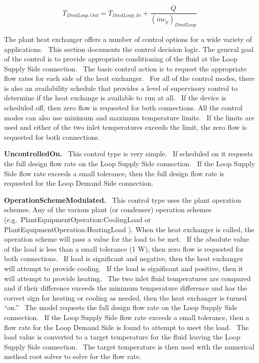 \begin{equation}
{T_{DmdLoop,Out}} = {T_{DmdLoop,In}} + \frac{{\dot Q}}{{{{\left( {\dot m{c_p}} \right)}_{DmdLoop}}}}
\end{equation}

The plant heat exchanger offers a number of control options for a wide variety of applications.~ This section documents the control decision logic. The general goal of the control is to provide appropriate conditioning of the fluid at the Loop Supply Side connection. ~The basic control action is to request the appropriate flow rates for each side of the heat exchanger.~ For all of the control modes, there is also an availability schedule that provides a level of supervisory control to determine if the heat exchange is available to run at all.~ If the device is scheduled off, then zero flow is requested for both connections. All the control modes can also use minimum and maximum temperature limits.~ If the limits are used and either of the two inlet temperatures exceeds the limit, the zero flow is requested for both connections.

\textbf{UncontrolledOn.}~ This control type is very simple.~ If scheduled on it requests the full design flow rate on the Loop Supply Side connection.~ If the Loop Supply Side flow rate exceeds a small tolerance, then the full design flow rate is requested for the Loop Demand Side connection.

\textbf{OperationSchemeModulated.}~ This control type uses the plant operation schemes. Any of the various plant (or condenser) operation schemes (e.g.~PlantEquipmentOperation:CoolingLoad or PlantEquipmentOperation:HeatingLoad ). When the heat exchanger is called, the operation scheme will pass a value for the load to be met.~ If the absolute value of the load is less than a small tolerance (1 W), then zero flow is requested for both connections.~ If load is significant and negative, then the heat exchanger will attempt to provide cooling.~ If the load is significant and positive, then it will attempt to provide heating.~ The two inlet fluid temperatures are compared and if their difference exceeds the minimum temperature difference and has the correct sign for heating or cooling as needed, then the heat exchanger is turned ``on.''~ The model requests the full design flow rate on the Loop Supply Side connection.~ If the Loop Supply Side flow rate exceeds a small tolerance, then a flow rate for the Loop Demand Side is found to attempt to meet the load.~ The load value is converted to a target temperature for the fluid leaving the Loop Supply Side connection.~ The target temperature is then used with the numerical method root solver to solve for the flow rate.

